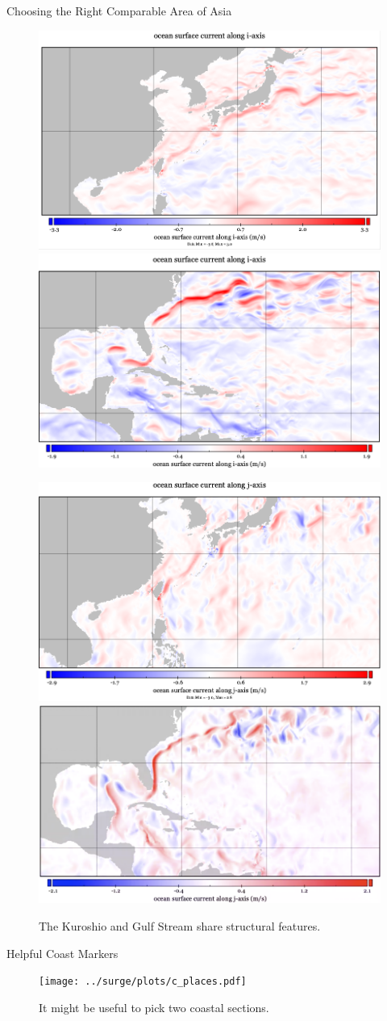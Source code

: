 \begin{frame}{Choosing the Right Comparable Area of Asia}
\vspace{-30pt}
\hspace{-30pt}
 \begin{minipage}{1.15\textwidth}
\begin{figure}[htb!]
    \centering
   \hspace{-40pt} \includegraphics[width=0.42\linewidth]{images/example-images/c-uos.png}
        \includegraphics[width=0.42\linewidth]{images/example-images/uos.png}

   \hspace{-40pt} \includegraphics[width=0.42\linewidth]{images/example-images/c-vos.png}
        \includegraphics[width=0.42\linewidth]{images/example-images/vos.png}
    \vspace{-10pt}
    \caption{The Kuroshio and Gulf Stream share structural features.}
    \label{fig:A}
\end{figure}
\end{minipage}
\end{frame}


\begin{frame}{Helpful Coast Markers}
\vspace{-20pt}
 \begin{minipage}{1.0\textwidth}
\begin{figure}[htb!]
    \centering
    \texttt{[image: ../surge/plots/c\_places.pdf]}
    \vspace{-15pt}
   \caption{It might be useful to pick two coastal sections. }
    \label{fig:}
\end{figure}
\end{minipage}
\end{frame}
